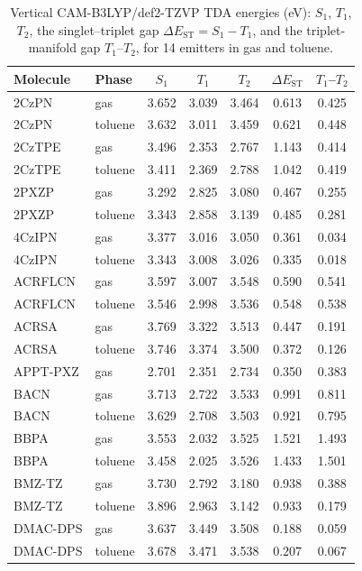 \documentclass[twoside,twocolumn,9pt]{extarticle}
\begin{document}
\begin{table}[htbp]
  \centering
  \caption{Vertical CAM-B3LYP/def2-TZVP TDA energies (eV): $S_1$, $T_1$, $T_2$, the
    singlet--triplet gap $\Delta E_\text{ST}=S_1-T_1$, and the triplet-manifold gap
    $T_1$--$T_2$, for \num{14} emitters in gas and toluene.}
  \label{tab:manifold}
  \scriptsize
  \begin{tabular}{llccccc}
    \toprule
    Molecule & Phase & $S_1$ & $T_1$ & $T_2$ & $\Delta E_\text{ST}$ & $T_1$--$T_2$ \\
    \midrule
    2CzPN & gas & 3.652 & 3.039 & 3.464 & 0.613 & 0.425 \\
    2CzPN & toluene & 3.632 & 3.011 & 3.459 & 0.621 & 0.448 \\
    2CzTPE & gas & 3.496 & 2.353 & 2.767 & 1.143 & 0.414 \\
    2CzTPE & toluene & 3.411 & 2.369 & 2.788 & 1.042 & 0.419 \\
    2PXZP & gas & 3.292 & 2.825 & 3.080 & 0.467 & 0.255 \\
    2PXZP & toluene & 3.343 & 2.858 & 3.139 & 0.485 & 0.281 \\
    4CzIPN & gas & 3.377 & 3.016 & 3.050 & 0.361 & 0.034 \\
    4CzIPN & toluene & 3.343 & 3.008 & 3.026 & 0.335 & 0.018 \\
    ACRFLCN & gas & 3.597 & 3.007 & 3.548 & 0.590 & 0.541 \\
    ACRFLCN & toluene & 3.546 & 2.998 & 3.536 & 0.548 & 0.538 \\
    ACRSA & gas & 3.769 & 3.322 & 3.513 & 0.447 & 0.191 \\
    ACRSA & toluene & 3.746 & 3.374 & 3.500 & 0.372 & 0.126 \\
    APPT-PXZ & gas & 2.701 & 2.351 & 2.734 & 0.350 & 0.383 \\
    BACN & gas & 3.713 & 2.722 & 3.533 & 0.991 & 0.811 \\
    BACN & toluene & 3.629 & 2.708 & 3.503 & 0.921 & 0.795 \\
    BBPA & gas & 3.553 & 2.032 & 3.525 & 1.521 & 1.493 \\
    BBPA & toluene & 3.458 & 2.025 & 3.526 & 1.433 & 1.501 \\
    BMZ-TZ & gas & 3.730 & 2.792 & 3.180 & 0.938 & 0.388 \\
    BMZ-TZ & toluene & 3.896 & 2.963 & 3.142 & 0.933 & 0.179 \\
    DMAC-DPS & gas & 3.637 & 3.449 & 3.508 & 0.188 & 0.059 \\
    DMAC-DPS & toluene & 3.678 & 3.471 & 3.538 & 0.207 & 0.067 \\

\end{tabular}
\end{table}
\end{document}
